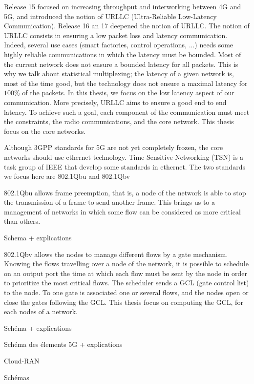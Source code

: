 \documentclass[a4paper,10pt]{article}
\begin{document}
Release 15 focused on increasing throughput and interworking between 4G and 5G, and introduced the notion of URLLC (Ultra-Reliable Low-Latency Communication). Release 16 an 17 deepened the notion of URLLC. The notion of URLLC consists in ensuring a low packet loss and latency communication. Indeed, several use cases (smart factories, control operations, ...) needs some highly reliable communications in which the latency must be bounded. Most of the current network does not ensure a bounded latency for all packets. This is why we talk about statistical multiplexing; the latency of a given network is, most of the time good, but the technology does not ensure a maximal latency for $100\%$ of the packets.  In this thesis, we focus on the low latency aspect of our communication. More precisely, URLLC aims to ensure a good end to end latency. To achieve such a goal, each component of the communication must meet the constraints, the radio communications, and the core network. This thesis focus on the core networks. 

Although 3GPP standards for 5G are not yet completely frozen, the core networks should use ethernet technology. Time Sensitive Networking (TSN) is a task group of IEEE that develop some standards in ethernet. The two standards we focus here are 802.1Qbu and 802.1Qbv \cite{ieee802}  
  
802.1Qbu allows frame preemption, that is, a node of the network is able to stop the transmission of a frame to send another frame. This brings us to a management of networks in which some flow can be considered as more critical than others. 

Schema + explications 

802.1Qbv allows the nodes to manage different flows by a gate mechanism. Knowing the flows travelling over a node of the network, it is possible to schedule on an output port the time at which each flow must be sent by the node in order to prioritize the most critical flows. The scheduler sends a  GCL (gate control list) to the node. To one gate is associated one or several flows, and the nodes open or close the gates following the GCL. This thesis focus on computing the GCL, for each nodes of a network. 

Schéma + explications 

 

Schéma des élements 5G + explications 

Cloud-RAN 

Schémas 
\end{document}
